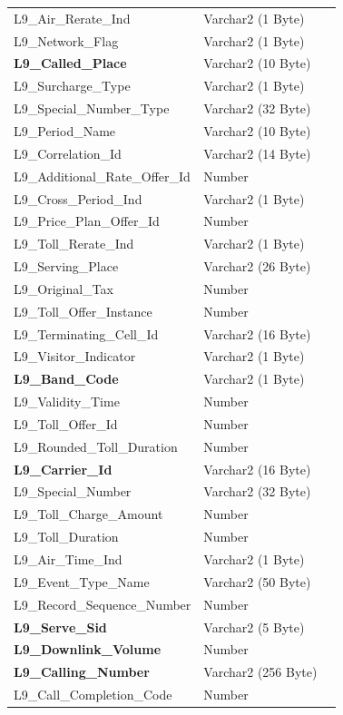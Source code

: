 \documentclass[12pt,twoside]{article}
\begin{document}
\begin{longtable}{l|l|l}
L9\_Air\_Rerate\_Ind & Varchar2 (1 Byte) & \\
L9\_Network\_Flag & Varchar2 (1 Byte) & \\
\textbf{L9\_Called\_Place} & Varchar2 (10 Byte) & \\
L9\_Surcharge\_Type & Varchar2 (1 Byte) & \\
L9\_Special\_Number\_Type & Varchar2 (32 Byte) & \\
L9\_Period\_Name & Varchar2 (10 Byte) & \\
L9\_Correlation\_Id & Varchar2 (14 Byte) & \\
L9\_Additional\_Rate\_Offer\_Id & Number & \\
L9\_Cross\_Period\_Ind & Varchar2 (1 Byte) & \\
L9\_Price\_Plan\_Offer\_Id & Number & \\
L9\_Toll\_Rerate\_Ind & Varchar2 (1 Byte) & \\
L9\_Serving\_Place & Varchar2 (26 Byte) & \\
L9\_Original\_Tax & Number & \\
L9\_Toll\_Offer\_Instance & Number & \\
L9\_Terminating\_Cell\_Id & Varchar2 (16 Byte) & \\
L9\_Visitor\_Indicator & Varchar2 (1 Byte) & \\
\textbf{L9\_Band\_Code} & Varchar2 (1 Byte) & \\
L9\_Validity\_Time & Number & \\
L9\_Toll\_Offer\_Id & Number & \\
L9\_Rounded\_Toll\_Duration & Number & \\
\textbf{L9\_Carrier\_Id} & Varchar2 (16 Byte) & \\
L9\_Special\_Number & Varchar2 (32 Byte) & \\
L9\_Toll\_Charge\_Amount & Number & \\
L9\_Toll\_Duration & Number & \\
L9\_Air\_Time\_Ind & Varchar2 (1 Byte) & \\
L9\_Event\_Type\_Name & Varchar2 (50 Byte) & \\
L9\_Record\_Sequence\_Number & Number & \\
\textbf{L9\_Serve\_Sid} & Varchar2 (5 Byte) & \\
\textbf{L9\_Downlink\_Volume} & Number & \\
\textbf{L9\_Calling\_Number} & Varchar2 (256 Byte) & \\
L9\_Call\_Completion\_Code & Number & \\

\end{longtable}
\end{document}
